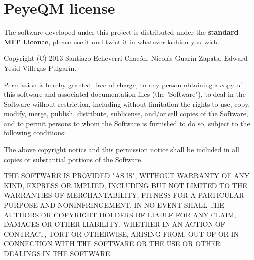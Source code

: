 \section{PeyeQM license}

The software developed under this project is distributed under the \textbf{standard MIT Licence},  please use it and twist it in whatever fashion you wish.

Copyright (C) 2013 Santiago Echeverri Chacón, Nicolás Guarín Zapata, Edward Yesid Villegas Pulgarín.

Permission is hereby granted, free of charge, to any person obtaining a copy of this software and associated documentation files (the "Software"), to deal in the Software without restriction, including without limitation the rights to use, copy, modify, merge, publish, distribute, sublicense, and/or sell copies of the Software, and to permit persons to whom the Software is furnished to do so, subject to the following conditions:

The above copyright notice and this permission notice shall be included in all copies or substantial portions of the Software.

THE SOFTWARE IS PROVIDED "AS IS", WITHOUT WARRANTY OF ANY KIND, EXPRESS OR IMPLIED, INCLUDING BUT NOT LIMITED TO THE WARRANTIES OF MERCHANTABILITY, FITNESS FOR A PARTICULAR PURPOSE AND NONINFRINGEMENT. IN NO EVENT SHALL THE AUTHORS OR COPYRIGHT HOLDERS BE LIABLE FOR ANY CLAIM, DAMAGES OR OTHER LIABILITY, WHETHER IN AN ACTION OF CONTRACT, TORT OR OTHERWISE, ARISING FROM, OUT OF OR IN CONNECTION WITH THE SOFTWARE OR THE USE OR OTHER DEALINGS IN THE SOFTWARE.

